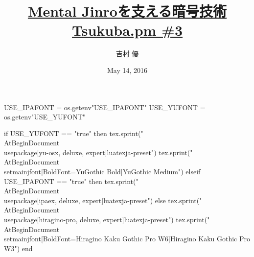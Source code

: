 \hypersetup{colorlinks,linkcolor=,urlcolor=links}

\beamertemplatenavigationsymbolsempty

\usepackage{luacode}
\usepackage{luatexja}
\usepackage{pgfpages}
\usepackage[osf]{mathpazo}

\begin{luacode*}
  USE_IPAFONT = os.getenv"USE_IPAFONT"
  USE_YUFONT = os.getenv"USE_YUFONT"
  
  if USE_YUFONT == "true" then
    tex.sprint("\\AtBeginDocument{\\usepackage[yu-osx, deluxe, expert]{luatexja-preset}}")
    tex.sprint("\\AtBeginDocument{\\setmainjfont[BoldFont=YuGothic Bold]{YuGothic Medium}}")
  elseif USE_IPAFONT == "true" then
    tex.sprint("\\AtBeginDocument{\\usepackage[ipaex, deluxe, expert]{luatexja-preset}}")
  else
    tex.sprint("\\AtBeginDocument{\\usepackage[hiragino-pro, deluxe, expert]{luatexja-preset}}")
    tex.sprint("\\AtBeginDocument{\\setmainjfont[BoldFont=Hiragino Kaku Gothic Pro W6]{Hiragino Kaku Gothic Pro W3}}")
  end
\end{luacode*}

\usepackage{epigraph}
\usepackage{etoolbox}
\usepackage{tikz}
\usepackage{framed}
\usepackage{libertine}
\usepackage[final]{listings}
\usepackage{amsmath}
\usepackage{mathtools}



\setmainfont[Numbers=OldStyle, BoldFont=Palatino Bold]{Palatino}
\setsansfont{CMU Sans Serif}
\setmonofont{CMU Typewriter Text}

\title[Mental Jinroを支える暗号技術]{%
  \href{https://github.com/y-yu/mental-jinro-slide}{Mental Jinroを支える暗号技術} \\
  \href{http://connpass.com/event/30661/}{\normalsize Tsukuba.pm \#3}
}
\author{吉村 優}
\date{May 14, 2016}


